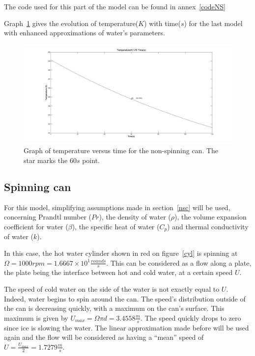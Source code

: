\documentclass{report}
\begin{document}
	The code used for this part of the model can be found in annex~\ref{codeNS}
	
	
	Graph~\ref{NSg} gives the evolution of temperature($K$) with time($s$) for the last model with enhanced approximations of water's parameters.
	\begin{figure}
		\centering
		\includegraphics[width=\textwidth]{img/NSg.jpg}
		\caption{Graph of temperature versus time for the non-spinning can. The star marks the $60s$ point.}
		\label{NSg}
	\end{figure}
	
	
	
	\subsection{Spinning can}\label{sc}
	
	For this model, simplifying assumptions made in section~\ref{nsc} will be used, concerning Prandtl number ($Pr$), the density of water ($\rho$), the volume expansion coefficient for water ($\beta$), the specific heat of water ($C_p$) and thermal conductivity of water ($k$).
	
	In this case, the hot water cylinder shown in red on figure~\ref{cyl} is spinning at $\Omega=1000rpm=1.6667\times 10^1 \frac{rounds}{s}$. This can be considered as a flow along a plate, the plate being the interface between hot and cold water, at a certain speed $U$.
	
	The speed of cold water on the side of the water is not exactly equal to $U$. Indeed, water begins to spin around the can. The speed's distribution outside of the can is decreasing quickly, with a maximum on the can's surface. This maximum is given by $U_{max}= \Omega \pi d=3.4558\frac{m}{s}$. The speed quickly drops to zero since ice is slowing the water. The linear approximation made before will be used again and the flow will be considered as having a ``mean'' speed of $U=\frac{U_{max}}{2}=1.7279\frac{m}{s}$.
	
\end{document}
